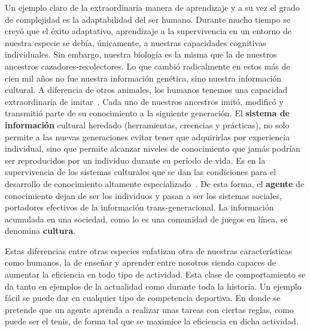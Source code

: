 \documentclass[11pt,twoside, spanish]{report} %
\begin{document}
Un ejemplo claro de la extraordinaria manera de aprendizaje y a su vez el grado de complejidad es la adaptabilidad del ser humano.
Durante mucho tiempo se crey\'o que el \'exito adaptativo, aprendizaje a la supervivencia en un entorno de nuestra especie se deb\'ia, \'unicamente, a nuestras capacidades cognitivas individuales.
Sin embargo, nuestra biolog\'ia es la misma que la de nuestros ancestros cazadores-recolectores.
Lo que cambi\'o radicalmente en estos m\'as de cien mil a\~nos no fue nuestra informaci\'on gen\'etica, sino nuestra informaci\'on cultural.
A diferencia de otros animales, los humanos tenemos una capacidad extraordinaria de imitar~\cite{richerson2010-geneCultureCoevolution}.
Cada uno de nuestros ancestros imit\'o, modific\'o y transmiti\'o parte de su conocimiento a la siguiente generaci\'on.
El \textbf{sistema de informaci\'on} cultural heredado (herramientas, creencias y pr\'acticas), no solo permite a las nuevas generaciones evitar tener que adquirirlas por experiencia individual, sino que permite alcanzar niveles de conocimiento que jam\'as podr\'ian ser reproducidos por un individuo durante su per\'iodo de vida.
Es en la supervivencia de los sistemas culturales que se dan las condiciones para el desarrollo de conocimiento altamente especializado~\cite{Boyd2011}.
De esta forma, el \textbf{agente} de conocimiento dejan de ser los individuos y pasan a ser los sistemas sociales, portadores efectivos de la informaci\'on trans-generacional.
La informaci\'on acumulada en una sociedad, como lo es una comunidad de juegos en l\'inea, se denomina \textbf{cultura}.

Estas diferencias entre otras especies enfatizan otra de nuestras caracter\'isticas como humanos, la de ense\~nar y aprender entre nosotros siendo capaces de aumentar la eficiencia en todo tipo de actividad.
Esta clase de comportamiento se da tanto en ejemplos de la actualidad como durante toda la historia. Un ejemplo f\'acil se puede dar en cualquier tipo de competencia deportiva.
En donde se pretende que un agente aprenda a realizar unas tareas con ciertas reglas, como puede ser el tenis, de forma tal que se maximice la eficiencia en dicha actividad.
\end{document}
